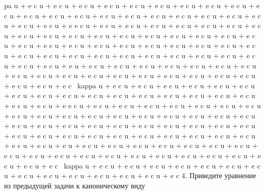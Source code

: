 \documentclass[
  ukrainian,
]{article}
\begin{document}
pa u + e c \kappa u + e c \kappa u + e c \kappa u + e c \kappa u + e c
\kappa u + e c \kappa u + e c \kappa u + e c \kappa u + e c \kappa u + e
c \kappa u + e c \kappa u + e c \kappa u + e c \kappa u + e c \kappa u +
e c \kappa u + e c \kappa u + e c \kappa u + e c \kappa u + e c \kappa u
+ e c \kappa u + e c \kappa u + e c \kappa u + e e c \kappa u + e c
\kappa u + e c \kappa u + e c \kappa u + e c \kappa u + e c \kappa u + e
c \kappa u + e c \kappa u + e c \kappa u + e c \kappa u + e c \kappa u +
e c \kappa u + e c \kappa u + e c \kappa u + e c \kappa u + e c \kappa u
+ e c \kappa u + e c \kappa u + e c \kappa u + e c \kappa u + e c
\kappa u + e c \kappa u + e c \kappa u + e c \kappa u + e c \kappa u + e
c \kappa u + e c \kappa u + e c \kappa u + e c \kappa u + e c \kappa u +
e c \kappa u + e c \kappa u + e c \kappa u + e c \kappa u + e c \kappa u
+ e c \kappa u + e c \kappa u + e c \kappa u + e c \kappa u + e c
\kappa u + e u + e c \kappa u + e c \kappa u + e c \kappa u + e c
\kappa u + e c \kappa u + e c \kappa u + e c \kappa u + e c \kappa u + e
c \kappa u + e c \kappa u + e c \kappa u + e c \kappa u + e c \kappa u +
e c \kappa u + e c \kappa u + e c \kappa u + e c \kappa u + e c \kappa u
+ e c \kappa u + e c ~kappa u + e c \kappa u + e c \kappa u + e c
\kappa u + e c \kappa u + e c \kappa u + e c \kappa u + e c \kappa u + e
c \kappa u + e c \kappa u + e c \kappa u + e c \kappa u + e c \kappa u +
e c \kappa u + e c \kappa u + e c \kappa u + e c \kappa u + e c \kappa u
+ e c \kappa u + e e c \kappa u + e c \kappa u + e c \kappa u + e c
\kappa u + e c \kappa u + e c \kappa u + e c \kappa u + e c \kappa u + e
c \kappa u + e c \kappa u + e c \kappa u + e c \kappa u + e c \kappa u +
e c \kappa u + e c \kappa u + e c \kappa u + e c \kappa u + e c \kappa u
+ e c \kappa u + e c \kappa u + e c \kappa u + e c \kappa u + e c
\kappa u + e c \kappa u + e c \kappa u + e c \kappa u + e c \kappa u + e
c \kappa u + e c \kappa u + e c \kappa u + e c \kappa u + e c \kappa u +
e c \kappa u + e c \kappa u + e c \kappa u + e c \kappa u + e c \kappa u
+ e c \kappa u + e c \kappa u + e c \kappa u + e u + e c \kappa u + e c
\kappa u + e c \kappa u + e c \kappa u + e c \kappa u + e c \kappa u + e
c \kappa u + e c \kappa u + e c \kappa u + e c \kappa u + e c \kappa u +
e c \kappa u + e c \kappa u + e c \kappa u + e c \kappa u + e c \kappa u
+ e c \kappa u + e c \kappa u + e c \kappa u + e c ~kappa u + e c
\kappa u + e c \kappa u + e c \kappa u + e c \kappa u + e c \kappa u + e
c \kappa u + e c \kappa u + e c \kappa u + e c \kappa u + e c \kappa u +
e c \kappa u + e c \kappa u + e c \kappa u + e c 4. Приведите уравнение
из предыдущей задачи к каноническому виду
\end{document}
